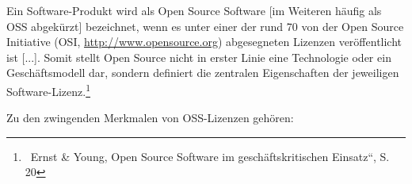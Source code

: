 \documentclass[a4paper]{article}
\newcommand\textstyleInternetlink[1]{\foreignlanguage{english}{\textcolor[rgb]{0.0,0.0,0.5019608}{#1}}}
\begin{document}
\bigskip


\bigskip

{
{\guillemotright}Ein Software-Produkt wird als Open Source Software [im
Weiteren h\"aufig als OSS abgek\"urzt] bezeichnet, wenn es unter einer
der rund 70 von der Open Source Initiative (OSI,
\href{http://www.opensource.org/}{\textstyleInternetlink{http://www.opensource.org}})
abgesegneten Lizenzen ver\"offentlicht ist [...]. Somit stellt Open
Source nicht in erster Linie eine Technologie oder ein
Gesch\"aftsmodell dar, sondern definiert die zentralen Eigenschaften
der jeweiligen Software-Lizenz.{\guillemotleft}\footnote{\ Ernst \&
Young, {\quotedblbase}Open Source Software im gesch\"aftskritischen
Einsatz{\textquotedblleft}, S. 20}}


\bigskip

{
Zu den zwingenden Merkmalen von OSS-Lizenzen geh\"oren:}

{
{\guillemotright}}
\end{document}
